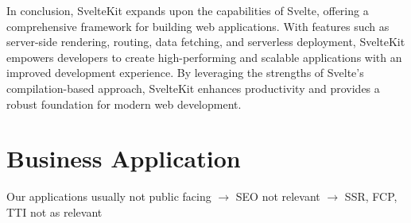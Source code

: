 In conclusion, SvelteKit expands upon the capabilities of Svelte, offering a comprehensive framework for building web applications. With features such as server-side rendering, routing, data fetching, and serverless deployment, SvelteKit empowers developers to create high-performing and scalable applications with an improved development experience. By leveraging the strengths of Svelte's compilation-based approach, SvelteKit enhances productivity and provides a robust foundation for modern web development.

\section{Business Application}
\label{sec:business-application}

Our applications usually not public facing $\rightarrow$ SEO not relevant $\rightarrow$ SSR, FCP, TTI not as relevant
